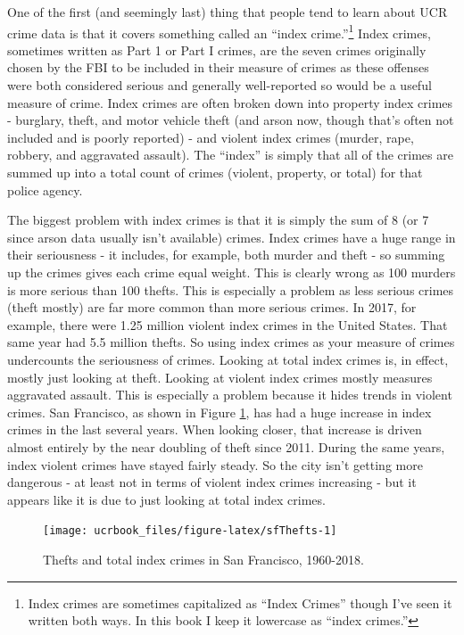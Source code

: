 \documentclass[
  12pt,
  openany]{book}
\begin{document}
One of the first (and seemingly last) thing that people tend to learn about UCR crime data is that it covers something called an ``index crime.''\footnote{Index crimes are sometimes capitalized as ``Index Crimes'' though I've seen it written both ways. In this book I keep it lowercase as ``index crimes.''} Index crimes, sometimes written as Part 1 or Part I crimes, are the seven crimes originally chosen by the FBI to be included in their measure of crimes as these offenses were both considered serious and generally well-reported so would be a useful measure of crime. Index crimes are often broken down into property index crimes - burglary, theft, and motor vehicle theft (and arson now, though that's often not included and is poorly reported) - and violent index crimes (murder, rape, robbery, and aggravated assault). The ``index'' is simply that all of the crimes are summed up into a total count of crimes (violent, property, or total) for that police agency.

The biggest problem with index crimes is that it is simply the sum of 8 (or 7 since arson data usually isn't available) crimes. Index crimes have a huge range in their seriousness - it includes, for example, both murder and theft - so summing up the crimes gives each crime equal weight. This is clearly wrong as 100 murders is more serious than 100 thefts. This is especially a problem as less serious crimes (theft mostly) are far more common than more serious crimes. In 2017, for example, there were 1.25 million violent index crimes in the United States. That same year had 5.5 million thefts. So using index crimes as your measure of crimes undercounts the seriousness of crimes. Looking at total index crimes is, in effect, mostly just looking at theft. Looking at violent index crimes mostly measures aggravated assault. This is especially a problem because it hides trends in violent crimes. San Francisco, as shown in Figure \ref{fig:sfThefts}, has had a huge increase in index crimes in the last several years. When looking closer, that increase is driven almost entirely by the near doubling of theft since 2011. During the same years, index violent crimes have stayed fairly steady. So the city isn't getting more dangerous - at least not in terms of violent index crimes increasing - but it appears like it is due to just looking at total index crimes.

\begin{figure}

{\centering \texttt{[image: ucrbook\_files/figure-latex/sfThefts-1]} 

}

\caption{Thefts and total index crimes in San Francisco, 1960-2018.}\label{fig:sfThefts}
\end{figure}
\end{document}
